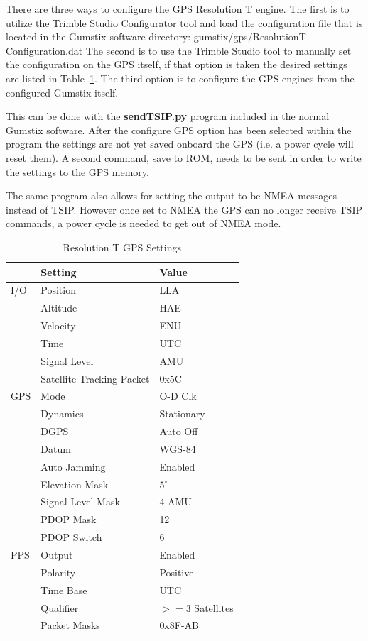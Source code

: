 There are three ways to configure the GPS Resolution T engine.
The first is to utilize the Trimble Studio Configurator tool and load the configuration file that is located in the Gumstix software directory: gumstix/gps/ResolutionT Configuration.dat
The second is to use the Trimble Studio tool to manually set the configuration on the GPS itself, if that option is taken the desired settings are listed in Table~\ref{su:table:suGPSSettings}.
The third option is to configure the GPS engines from the configured Gumstix itself.

This can be done with the {\bf sendTSIP.py} program included in the normal Gumstix software.
After the configure GPS option has been selected within the program the settings are not yet saved onboard the GPS (i.e. a power cycle will reset them).
A second command, save to ROM, needs to be sent in order to write the settings to the GPS memory.

The same program also allows for setting the output to be NMEA messages instead of TSIP.
However once set to NMEA the GPS can no longer receive TSIP commands, a power cycle is needed to get out of NMEA mode.

\begin{table}[h!]
\begin{center}
\begin{tabular}{|p{.5in}|p{2in}|p{1.5in}|}
\hline
{\bf } &	{\bf Setting} &	{\bf Value}\\
\hline
\rule{0pt}{3ex}
I/O	&Position	&	LLA\\ 
	&Altitude	&	HAE\\ 
	&Velocity	&	ENU\\ 
	&Time	&	UTC\\ 
	&Signal Level	&	AMU\\ 
	&Satellite Tracking Packet	&	0x5C\\ 
\hline
GPS	&Mode	&	O-D Clk\\ 
	&Dynamics	&	Stationary\\
	&DGPS	&	Auto Off\\
	&Datum	&	WGS-84\\
	&Auto Jamming	&	Enabled\\
	&Elevation Mask	&	$5^\circ$\\
	&Signal Level Mask	&	4 AMU\\
	&PDOP Mask	&	12\\
	&PDOP Switch	&	6\\
\hline
PPS	&Output	&	Enabled\\ 
	&Polarity	&	Positive\\ 
	&Time Base	&	UTC\\ 
	&Qualifier	&	$>=3$ Satellites\\ 
	&Packet Masks	&	0x8F-AB\\ 
\hline
\end{tabular}
\end{center}
\label{su:table:suGPSSettings}
\caption{Resolution T GPS Settings}
\end{table}

